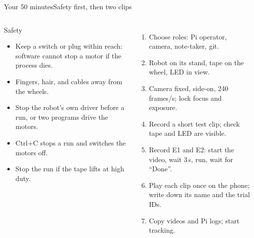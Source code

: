 %
\begin{frame}{Your 50 minutes}{Safety first, then two clips}
  \footnotesize
  \begin{columns}[T]
    \begin{alertblock}{\footnotesize Safety}
      \scriptsize
      \begin{itemize}\setlength{\itemsep}{1pt}
        \item Keep a switch or plug within reach: software cannot stop a motor if the process dies.
        \item Fingers, hair, and cables away from the wheels.
        \item Stop the robot's own driver before a run, or two programs drive the motors.
        \item Ctrl+C stops a run and switches the motors off.
        \item Stop the run if the tape lifts at high duty.
      \end{itemize}
    \end{alertblock}
    \scriptsize
    \begin{enumerate}\setlength{\itemsep}{1pt}
      \item Choose roles: Pi operator, camera, note-taker, git.
      \item Robot on its stand, tape on the wheel, LED in view.
      \item Camera fixed, side-on, 240 frames/s; \alert{lock focus and exposure}.
      \item Record a short test clip; check tape and LED are visible.
      \item Record E1 and E2: start the video, wait 3\,s, run, wait for ``Done''.
      \item Play each clip once on the phone; write down its name and the trial IDs.
      \item Copy videos and Pi logs; start tracking.
    \end{enumerate}
  \end{columns}
\end{frame}
